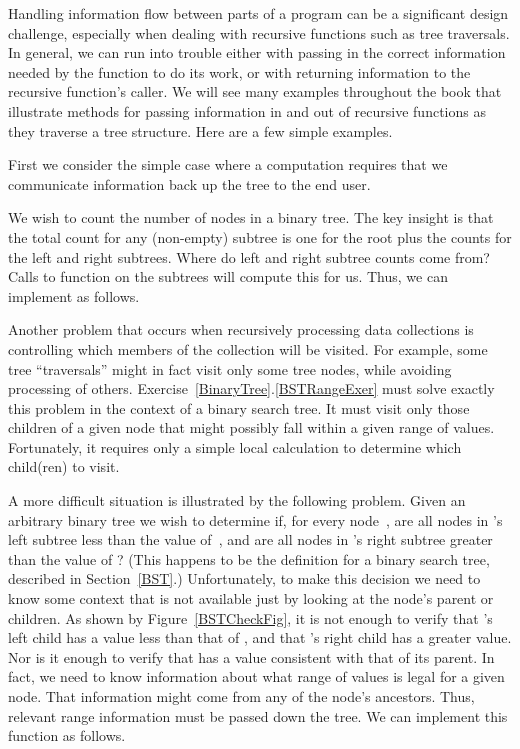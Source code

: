 Handling information flow between parts of a program can
be a significant design challenge, especially when dealing with
recursive functions such as tree traversals.
In general, we can run into trouble either with passing in the correct
information needed by the function to do its work,
or with returning information to the recursive function's caller.
We will see many examples throughout the book that illustrate methods
for passing information in and out of recursive functions as they
traverse a tree structure.
Here are a few simple examples.

First we consider the simple case where a computation requires
that we communicate information back up the tree to the end user.

\begin{example}
We wish to count the number of nodes in a binary tree.
The key insight is that the total count for any (non-empty) subtree is
one for the root plus the counts for the left and right subtrees.
Where do left and right subtree counts come from?
Calls to function  on the subtrees will compute this for
us.
Thus, we can implement  as follows.


\end{example}


Another problem that occurs when recursively processing data
collections is controlling which members of the collection will be
visited.
For example, some tree ``traversals'' might in fact visit only some
tree nodes, while avoiding processing of others.
Exercise~\ref{BinaryTree}.\ref{BSTRangeExer} must solve exactly this
problem in the context of a binary search tree.
It must visit only those children of a given node that might possibly
fall within a given range of values.
Fortunately, it requires only a simple local calculation to determine
which child(ren) to visit.

A more difficult situation is illustrated by the following problem.
Given an arbitrary binary tree we wish to determine if,
for every node~, are all nodes in 's left subtree
less than the value of~, and are all nodes in 's right
subtree greater than the value of ?
(This happens to be the definition for a binary search tree, described
in Section~\ref{BST}.)
Unfortunately, to make this decision we need to know some context
that is not available just by looking at the node's parent or children.
As shown by Figure~\ref{BSTCheckFig},
it is not enough to verify that 's left child has a value less
than that of , and that 's right child has a greater value.
Nor is it enough to verify that  has a value consistent with
that of its parent.
In fact, we need to know information about what range of values is
legal for a given node.
That information might come from any of the node's ancestors.
Thus, relevant range information must be passed down the tree.
We can implement this function as follows.

